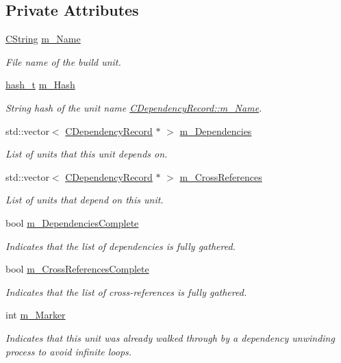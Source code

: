 \subsection*{Private Attributes}
\begin{DoxyCompactItemize}
\item 
\hyperlink{classCString}{C\-String} \hyperlink{classCDependencyRecord_a1eb617707168568e4d2c503150354f09}{m\-\_\-\-Name}
\begin{DoxyCompactList}\small\item\em File name of the build unit. \end{DoxyCompactList}\item 
\hyperlink{stringhash_8h_a488906826f8aaf7e850c35889d560089}{hash\-\_\-t} \hyperlink{classCDependencyRecord_a4431e94dbd98487fcd0e9852b7cffa57}{m\-\_\-\-Hash}
\begin{DoxyCompactList}\small\item\em String hash of the unit name \hyperlink{classCDependencyRecord_a1eb617707168568e4d2c503150354f09}{C\-Dependency\-Record\-::m\-\_\-\-Name}. \end{DoxyCompactList}\item 
std\-::vector$<$ \hyperlink{classCDependencyRecord}{C\-Dependency\-Record} $\ast$ $>$ \hyperlink{classCDependencyRecord_a169a19e632aa59249d667ef45e2b2560}{m\-\_\-\-Dependencies}
\begin{DoxyCompactList}\small\item\em List of units that this unit depends on. \end{DoxyCompactList}\item 
std\-::vector$<$ \hyperlink{classCDependencyRecord}{C\-Dependency\-Record} $\ast$ $>$ \hyperlink{classCDependencyRecord_ab9ce653ee88189e3aaf964a8dc65b606}{m\-\_\-\-Cross\-References}
\begin{DoxyCompactList}\small\item\em List of units that depend on this unit. \end{DoxyCompactList}\item 
bool \hyperlink{classCDependencyRecord_af5ddb7b517658fd95a80c04d94f555dd}{m\-\_\-\-Dependencies\-Complete}
\begin{DoxyCompactList}\small\item\em Indicates that the list of dependencies is fully gathered. \end{DoxyCompactList}\item 
bool \hyperlink{classCDependencyRecord_a831a0a5935519f39e1c100fd8a65224f}{m\-\_\-\-Cross\-References\-Complete}
\begin{DoxyCompactList}\small\item\em Indicates that the list of cross-\/references is fully gathered. \end{DoxyCompactList}\item 
int \hyperlink{classCDependencyRecord_a0327e854ac8b0bc48eefe3155a84475e}{m\-\_\-\-Marker}
\begin{DoxyCompactList}\small\item\em Indicates that this unit was already walked through by a dependency unwinding process to avoid infinite loops. \end{DoxyCompactList}\end{DoxyCompactItemize}


